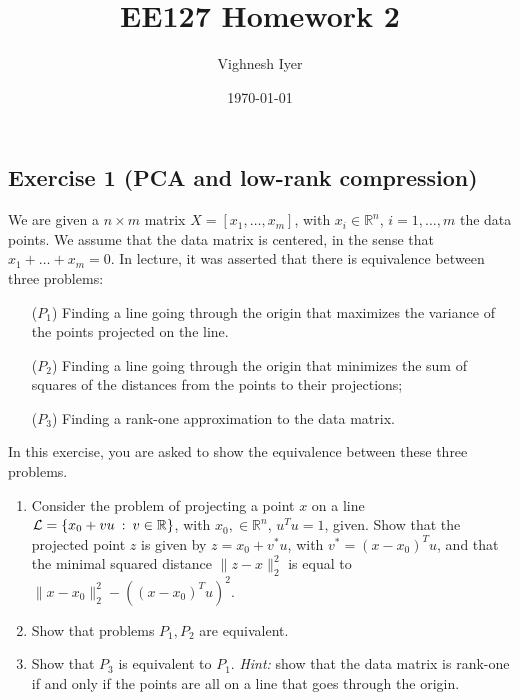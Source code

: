 \documentclass[11pt]{article}
\begin{document}
\title{EE127 Homework 2}
\author{Vighnesh Iyer}
\date{\today}
\maketitle

\subsection*{Exercise 1 (PCA and low-rank compression)}

We are given a $n \times m$ matrix $X = [x_1,\ldots,x_m]$, with $x_i \in \mathbb{R}^{n}$, $i=1,\ldots,m$ the data points.  We assume that the data matrix is centered, in the sense that $x_1+\ldots+x_m = 0$. In lecture, it was asserted that there is equivalence between three problems:
\begin{itemize}
    \item[($P_1$)] Finding a line going through the origin that maximizes the variance of the points projected on the line.
    \item[($P_2$)] Finding a line going through the origin that minimizes the sum of squares of the distances from the points to their projections;
    \item[($P_3$)] Finding a rank-one approximation to the data matrix.
\end{itemize}
In this exercise, you are asked to show the equivalence between these three problems.
\begin{enumerate}
    \item Consider the problem of projecting a point $x$ on a line ${\cal L} = \{x_0 + v u \::\: v \in \mathbb{R}\}$, with $x_0, \in \mathbb{R}^n$, $u^Tu=1$, given. Show that the projected point $z$ is given by $z = x_0+v^* u$, with $v^* = (x-x_0)^Tu$, and that the minimal squared distance $\|z-x\|_2^2$ is equal to $\|x-x_0\|_2^2 - ((x-x_0)^Tu)^2$.
    \item Show that problems $P_1,P_2$ are equivalent.
    \item Show that $P_3$ is equivalent to $P_1$. \emph{Hint: } show that the data matrix is rank-one if and only if the points are all on a line that goes through the origin.
\end{enumerate}
\end{document}
